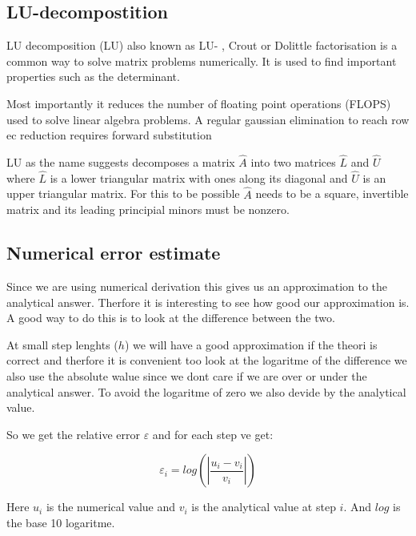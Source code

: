 \documentclass[twoside,twocolumn]{article}
\newcommand{\nl}{

\medskip
\noindent
}
\begin{document}
\subsection{LU-decompostition}
LU decomposition (LU) also known as LU- , Crout or Dolittle factorisation \cite{linalg:lay}\cite{compfys} is a common way to solve matrix problems numerically. It is used to find important properties such as the determinant.
\nl
Most importantly it reduces the number of floating point operations (FLOPS) used to solve linear algebra problems.
A regular gaussian elimination to reach row ec reduction requires forward substitution 
\nl
LU as the name suggests decomposes a matrix $\hat{A}$ into  two matrices $\hat{L}$ and $\hat{U}$ where $\hat{L}$ is a lower triangular matrix with ones along its diagonal and $\hat{U}$ is an upper triangular matrix. For this to be possible $\hat{A}$ needs to be a square, invertible matrix and its leading principial minors must be nonzero.

\subsection{Numerical error estimate}

Since we are using numerical derivation this gives us an approximation to the analytical answer.
Therfore it is interesting to see how good our approximation is.    
A good way to do this is to look at the difference between the two.
\nl
At small step lenghts ($h$) we will have a good approximation if the theori is correct and therfore it is convenient too look at the logaritme of the difference we also use the absolute walue since we dont care if we are over or under the analytical answer. To avoid the logaritme of zero we also devide by the analytical value.
\nl
So we get the relative error $\varepsilon$ and for each step ve get:

\begin{equation}
\varepsilon_i = log\left(\left|\frac{u_i - v_i}{v_i}\right|\right)
\end{equation}

Here $u_i$ is the numerical value and $v_i$ is the analytical value at step $i$. And $log$ is the base 10 logaritme.
\end{document}
